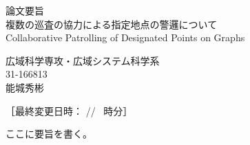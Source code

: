 \documentclass[a4paper,12pt]{jsarticle}
\begin{document}
\begin{center}
  {\LARGE 論文要旨}\\
  \vfill
  {\LARGE 複数の巡査の協力による指定地点の警邏について}\\
  {\normalsize Collaborative Patrolling of Designated Points on Graphs}
\end{center}

\begin{flushright}
{\large
広域科学専攻・広域システム科学系 \\
31-166813 \\
能城秀彬
}
\end{flushright} 
\vspace{30pt}

［最終変更日時：
{\the\year/\the\month/\the\day\ {\the\hour} 時{\the\minute}分}］

ここに要旨を書く。





\thispagestyle{empty}  %
\end{document}
